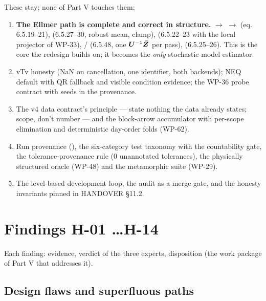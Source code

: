 These stay; none of Part V touches them:
\begin{enumerate}
\item \textbf{The Ellmer path is complete and correct in structure.}  $\to$  $\to$  (eq. 6.5.19--21),  (6.5.27--30, robust mean, clamp),  (6.5.22--23 with the local projector of WP-33), / (6.5.48, one $\bm{U}^{-1}\bar{\bm{Z}}$ per pass),  (6.5.25--26). This is the core the redesign builds on; it becomes the \emph{only} stochastic-model estimator.
\item vTv honesty (NaN on cancellation, one identifier, both backends); NEQ default with QR fallback and visible condition evidence; the WP-36 probe contract with seeds in the provenance.
\item The v4 data contract's principle --- state nothing the data already states; scope, don't number --- and the block-arrow accumulator with per-scope elimination and deterministic day-order folds (WP-62).
\item Run provenance (), the six-category test taxonomy with the countability gate, the tolerance-provenance rule (0 unannotated tolerances), the physically structured oracle (WP-48) and the metamorphic suite (WP-29).
\item The level-based development loop, the audit as a merge gate, and the honesty invariants pinned in HANDOVER §11.2.
\end{enumerate}

\chapter{Findings H-01 \ldots H-14}
\label{ch:findings}

Each finding: evidence, verdict of the three experts, disposition (the work package of Part V that addresses it).

\section*{Design flaws and superfluous paths}

